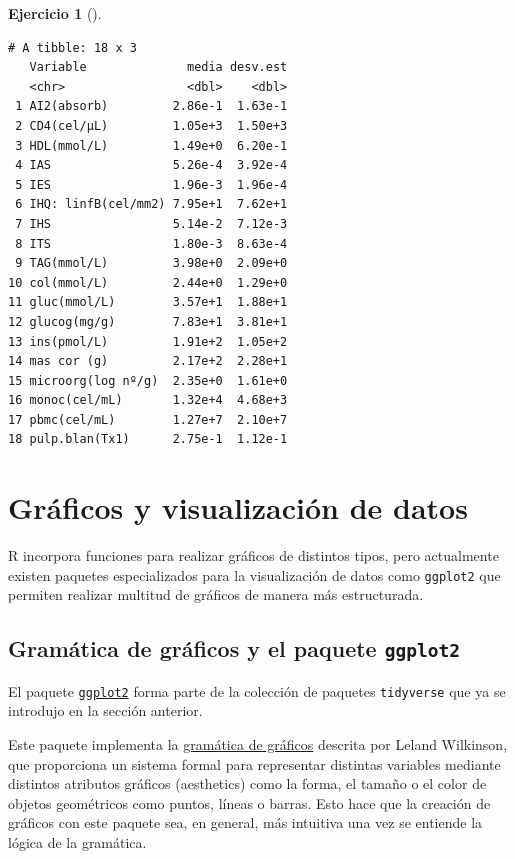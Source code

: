 \documentclass[
  a4paper,
]{scrreport}
\theoremstyle{definition}
\newtheorem{exercise}{Ejercicio}[chapter]
\theoremstyle{definition}
\theoremstyle{remark}
\begin{document}
\begin{exercise}[]
\begin{enumerate}
\begin{tcolorbox}
\begin{verbatim}
# A tibble: 18 x 3
   Variable              media desv.est
   <chr>                 <dbl>    <dbl>
 1 AI2(absorb)         2.86e-1  1.63e-1
 2 CD4(cel/µL)         1.05e+3  1.50e+3
 3 HDL(mmol/L)         1.49e+0  6.20e-1
 4 IAS                 5.26e-4  3.92e-4
 5 IES                 1.96e-3  1.96e-4
 6 IHQ: linfB(cel/mm2) 7.95e+1  7.62e+1
 7 IHS                 5.14e-2  7.12e-3
 8 ITS                 1.80e-3  8.63e-4
 9 TAG(mmol/L)         3.98e+0  2.09e+0
10 col(mmol/L)         2.44e+0  1.29e+0
11 gluc(mmol/L)        3.57e+1  1.88e+1
12 glucog(mg/g)        7.83e+1  3.81e+1
13 ins(pmol/L)         1.91e+2  1.05e+2
14 mas cor (g)         2.17e+2  2.28e+1
15 microorg(log nº/g)  2.35e+0  1.61e+0
16 monoc(cel/mL)       1.32e+4  4.68e+3
17 pbmc(cel/mL)        1.27e+7  2.10e+7
18 pulp.blan(Tx1)      2.75e-1  1.12e-1
\end{verbatim}

  \end{tcolorbox}
\end{enumerate}

\end{exercise}


\chapter{Gráficos y visualización de
datos}\label{gruxe1ficos-y-visualizaciuxf3n-de-datos}

R incorpora funciones para realizar gráficos de distintos tipos, pero
actualmente existen paquetes especializados para la visualización de
datos como \texttt{ggplot2} que permiten realizar multitud de gráficos
de manera más estructurada.

\section{\texorpdfstring{Gramática de gráficos y el paquete
\texttt{ggplot2}}{Gramática de gráficos y el paquete ggplot2}}\label{gramuxe1tica-de-gruxe1ficos-y-el-paquete-ggplot2}

El paquete \href{https://ggplot2.tidyverse.org/}{\texttt{ggplot2}} forma
parte de la colección de paquetes \texttt{tidyverse} que ya se introdujo
en la sección anterior.

Este paquete implementa la
\href{https://www.academia.edu/54823545/The_grammar_of_graphics}{gramática
de gráficos} descrita por Leland Wilkinson, que proporciona un sistema
formal para representar distintas variables mediante distintos atributos
gráficos (aesthetics) como la forma, el tamaño o el color de objetos
geométricos como puntos, líneas o barras. Esto hace que la creación de
gráficos con este paquete sea, en general, más intuitiva una vez se
entiende la lógica de la gramática.
\end{document}
